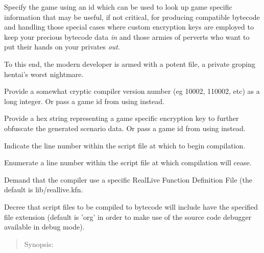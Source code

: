   \begin{nicelist}
  \item[\clbarg{G}{game}{GID}]
    Specify the \compiler game using an id which can be used to look up game
	specific information that may be useful, if not critical, for producing
	compatible bytecode and handling those special cases where custom encryption
	keys are employed to keep your precious bytecode data \emph{in} and those
	armies of perverts who want to put their hands on your privates \emph{out}.
	
	To this end, the modern \compiler developer is armed with a potent 
	 file, a private groping hentai's worst nightmare.
  \item[\clbarg{c}{compiler}{LONG}]
	Provide a somewhat cryptic compiler version number (eg 10002, 110002, etc)
	as a long integer.
	Or pass a game id from  using  instead.
  \item[\clbarg{k}{key}{KEY}]
	Provide a hex string representing a game specific encryption key to further
	obfuscate the generated scenario data.
	Or pass a game id from  using  instead.

  \end{nicelist}

  \begin{nicelist}
  \item[\clbarg{F}{from}{LINE}]
	Indicate the line number within the script file at which to begin compilation.
  \item[\clbarg{T}{to}{LINE}]
	Enumerate a line number within the script file at which compilation will cease.
  \item[\clbarg{}{kfn}{FILE}]
	Demand that the compiler use a specific RealLive Function Definition File
	(the default is lib/reallive.kfn.
  \item[\clbarg{}{ext}{EXT}]
	Decree that script files to be compiled to bytecode will include have
	the specified file extension (default is 'org' in order to make use of
	the source code debugger available in debug mode).
  \end{nicelist}

\clearpage
{}

  \begin{quote}
    Synopsis:   
  \end{quote}

